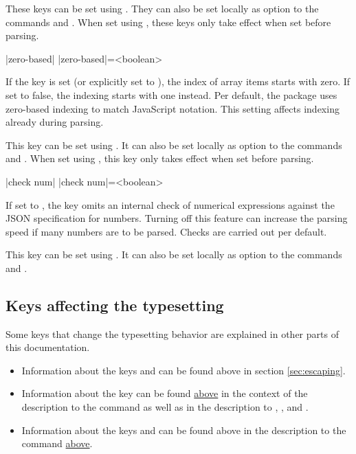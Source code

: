 \documentclass[a4paper]{article}
\begin{document}
{{These keys can be set using \macro{\JSONParseSet}. They can also be set locally as option to the commands \macro{\JSONParse} and \macro{\JSONParseFromFile}. When set using \macro{\JSONParseSet}, these keys only take effect when set before parsing.

\begin{macrodef}
|zero-based|
|zero-based|={<boolean>}
\end{macrodef}
If the key  is set (or explicitly set to ), the index of array items starts with zero. If set to false, the indexing starts with one instead. Per default, the package uses zero-based indexing to match JavaScript notation. This setting affects indexing already during parsing.

This key can be set using \macro{\JSONParseSet}. It can also be set locally as option to the commands \macro{\JSONParse} and \macro{\JSONParseFromFile}. When set using \macro{\JSONParseSet}, this key only takes effect when set before parsing.

\begin{macrodef}
|check num|
|check num|={<boolean>}
\end{macrodef}
If set to , the key  omits an internal check of numerical expressions against the JSON specification for numbers. Turning off this feature can increase the parsing speed if many numbers are to be parsed. Checks are carried out per default.

This key can be set using \macro{\JSONParseSet}. It can also be set locally as option to the commands \macro{\JSONParse} and \macro{\JSONParseFromFile}.

\subsection{Keys affecting the typesetting}

Some keys that change the typesetting behavior are explained in other parts of this documentation.

\begin{itemize}
\item Information about the keys  and  can be found above in section \ref{sec:escaping}.
\item Information about the key  can be found \hyperlink{key:storein}{above} in the context of the description to the command \macro{\JSONParseValue} as well as in the description to \macro{\JSONParseKeys}, \macro{\JSONParseArrayCount}, \macro{\JSONParseArrayUse} and \macro{\JSONParseArrayMapInline}.
\item Information about the keys  and  can be found above in the description to the command \macro{\JSONParseArrayMapFunction} \hyperlink{macro:arraymapfunction}{above}.
\end{itemize}

}}
\end{document}

